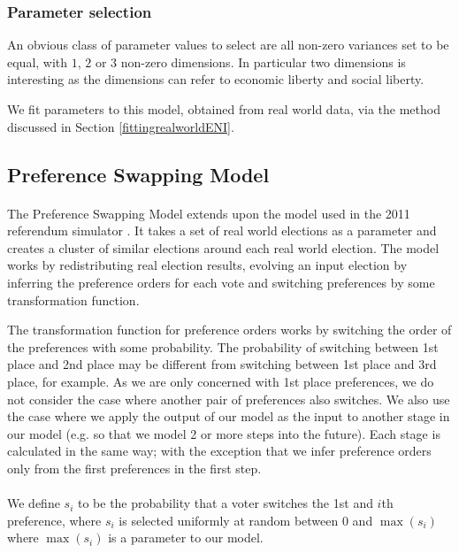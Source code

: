 \documentclass{article}
\begin{document}
\subsubsection*{Parameter selection}
An obvious class of parameter values to select are all non-zero variances set to be equal, with $1$, $2$ or $3$ non-zero dimensions. In particular two dimensions is interesting as the dimensions can refer to economic liberty and social liberty. %

We fit parameters to this model, obtained from real world data, via the method discussed in Section \ref{fittingrealworldENI}.

\subsection{Preference Swapping Model}
\label{sec:prefswapping}
\paragraph{}
The Preference Swapping Model extends upon the model used in the 2011 referendum simulator \cite{nzreferendumsim}. It takes a set of real world elections as a parameter and creates a cluster of similar elections around each real world election. The model works by redistributing real election results, evolving an input election by inferring the preference orders for each vote and switching preferences by some transformation function.

The transformation function for preference orders works by switching the order of the preferences with some probability. The probability of switching between 1st place and 2nd place may be different from switching between 1st place and 3rd place, for example. As we are only concerned with 1st place preferences, we do not consider the case where another pair of preferences also switches. We also use the case where we apply the output of our model as the input to another stage in our model (e.g. so that we model 2 or more steps into the future). Each stage is calculated in the same way; with the exception that we infer preference orders only from the first preferences in the first step.


\paragraph{}
We define $s_i$ to be the probability that a voter switches the 1st and $i$th preference, where $s_i$ is selected uniformly at random between $0$ and $\max(s_i)$ where $\max(s_i)$ is a parameter to our model.
\end{document}
